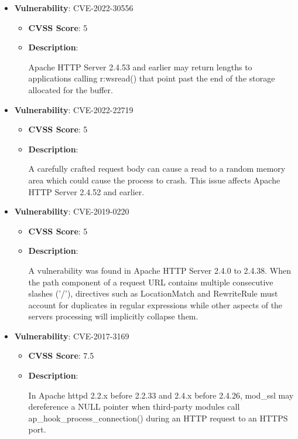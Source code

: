 \documentclass{article}
\begin{document}
\begin{itemize}
        \item \textbf{Vulnerability}: CVE-2022-30556
        \begin{itemize}
            \item \textbf{CVSS Score}:  5 
            \item \textbf{Description}:
            \parbox[t]{0.9\linewidth}{
                \ttfamily Apache HTTP Server 2.4.53 and earlier may return lengths to applications calling r:wsread() that point past the end of the storage allocated for the buffer.
            }
        \end{itemize}
    
        \item \textbf{Vulnerability}: CVE-2022-22719
        \begin{itemize}
            \item \textbf{CVSS Score}:  5 
            \item \textbf{Description}:
            \parbox[t]{0.9\linewidth}{
                \ttfamily A carefully crafted request body can cause a read to a random memory area which could cause the process to crash. This issue affects Apache HTTP Server 2.4.52 and earlier.
            }
        \end{itemize}
    
        \item \textbf{Vulnerability}: CVE-2019-0220
        \begin{itemize}
            \item \textbf{CVSS Score}:  5 
            \item \textbf{Description}:
            \parbox[t]{0.9\linewidth}{
                \ttfamily A vulnerability was found in Apache HTTP Server 2.4.0 to 2.4.38. When the path component of a request URL contains multiple consecutive slashes ('/'), directives such as LocationMatch and RewriteRule must account for duplicates in regular expressions while other aspects of the servers processing will implicitly collapse them.
            }
        \end{itemize}
    
        \item \textbf{Vulnerability}: CVE-2017-3169
        \begin{itemize}
            \item \textbf{CVSS Score}:  7.5 
            \item \textbf{Description}:
            \parbox[t]{0.9\linewidth}{
                \ttfamily In Apache httpd 2.2.x before 2.2.33 and 2.4.x before 2.4.26, mod\_ssl may dereference a NULL pointer when third-party modules call ap\_hook\_process\_connection() during an HTTP request to an HTTPS port.
            }
        \end{itemize}
    

\end{itemize}
\end{document}
